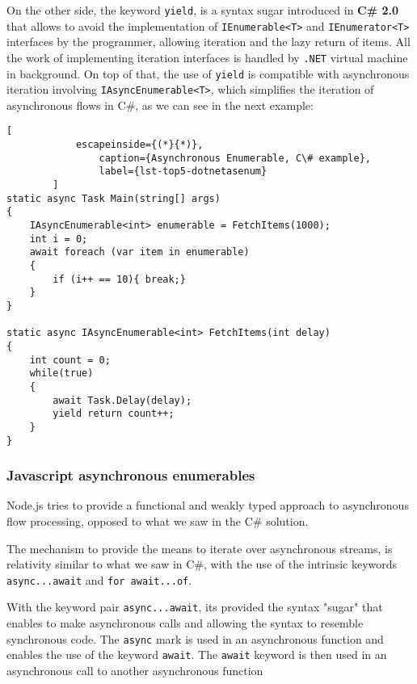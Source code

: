 	On the other side, the keyword \texttt{yield}, is a syntax sugar introduced in \textbf{C\# 2.0} that allows to avoid the implementation of \texttt{IEnumerable<T>} and \texttt{IEnumerator<T>} interfaces by the programmer,
	allowing iteration and the lazy return of items. All the work of implementing iteration interfaces is handled by \texttt{.NET} virtual machine in background. 
	On top of that, the use of \texttt{yield} is compatible with asynchronous iteration involving \texttt{IAsyncEnumerable<T>}, which simplifies the iteration of asynchronous flows in C\#, as we can see in the next example:
	


	\begin{center}
		\lstset{basicstyle=\scriptsize\ttfamily,frame=bottomline}
		\begin{minipage}[t][][b]{.46\textwidth}
		\begin{lstlisting}[
			escapeinside={(*}{*)},
				caption={Asynchronous Enumerable, C\# example},
				label={lst-top5-dotnetasenum}
		]
static async Task Main(string[] args)
{
	IAsyncEnumerable<int> enumerable = FetchItems(1000);
	int i = 0;
	await foreach (var item in enumerable)
	{
		if (i++ == 10){ break;}
	}
}

static async IAsyncEnumerable<int> FetchItems(int delay)
{
	int count = 0;
	while(true)
	{
		await Task.Delay(delay);
		yield return count++;
	}
}

		\end{lstlisting}
		\end{minipage}
\end{center}

	
\subsubsection{Javascript asynchronous enumerables}
\label{jsae}
	Node.js tries to provide a functional and weakly typed approach to asynchronous flow processing, opposed to what we saw in the C\# solution.

	The mechanism to provide the means to iterate over asynchronous streams, is relativity similar to what we saw in C\#, with the use of the intrinsic keywords \texttt{async...await} and \texttt{for await...of}.

	With the keyword pair \texttt{async...await}, its provided the syntax "sugar" that enables to make asynchronous calls and allowing the syntax to resemble synchronous code. 
	The \texttt{async} mark is used in an asynchronous function and enables the use of the keyword \texttt{await}. The \texttt{await} keyword is then used in an asynchronous call to another asynchronous function

